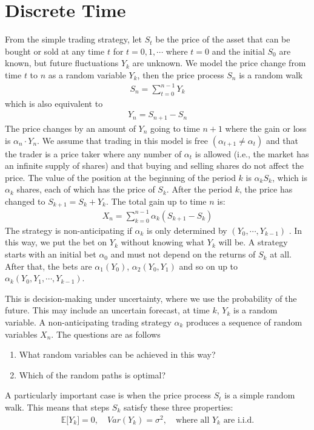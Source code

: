 \section{Discrete Time}
From the simple trading strategy\cite{online:stochastic-calculus}, let $S_t$ be the price of the asset that can be bought or sold at any time $t$ for $t=0,1,\cdots$ where $t=0$ and the initial $S_0$ are known, but future fluctuations $Y_k$ are unknown. We model the price change from time $t$ to $n$ as a random variable $Y_k$, then the price process $S_n$ is a random walk
\begin{align*}
S_{n} = \sum_{t=0}^{n-1} Y_k
\end{align*}
which is also equivalent to
\begin{align*}
Y_{n} = S_{n+1} - S_n
\end{align*}
The price changes by an amount of $Y_n$ going to time $n+1$ where the gain or loss is $\alpha_n \cdot Y_n$. We assume that trading in this model is free $(\alpha_{t+1} \ne \alpha_t)$ and that the trader is a price taker where any number of $\alpha_t$ is allowed (i.e., the market has an infinite supply of shares) and that buying and selling shares do not affect the price. The value of the position at the beginning of the period $k$ is $\alpha_k S_k$, which is $\alpha_k$ shares, each of which has the price of $S_k$. After the period $k$, the price has changed to $S_{k+1} = S_k + Y_k$. The total gain up to time $n$ is:
\begin{align}\label{eq:discrete_ito_integral}
X_n = \sum_{k=0}^{n-1} \alpha_k (S_{k+1} - S_k)
\end{align}
The strategy is non-anticipating if $\alpha_k$ is only determined by $(Y_0, \cdots, Y_{k-1})$ .  In this way, we put the bet on $Y_k$ without knowing what $Y_k$ will be. A strategy starts with an initial bet $\alpha_0$ and must not depend on the returns of $S_k$ at all. After that, the bets are  $\alpha_1(Y_0)$, $\alpha_2(Y_0,Y_1)$ and so on up to $\alpha_k(Y_0,Y_1,\cdots,Y_{k-1})$.

This is decision-making under uncertainty, where we use the probability of the future. This may include an uncertain forecast, at time $k$, $Y_k$ is a random variable. A non-anticipating trading strategy $\alpha_k$ produces a sequence of random variables $X_n$. The questions are as follows
\begin{enumerate}
\item  What random variables can be achieved in this way?
\item Which of the random paths is optimal?
\end{enumerate}
A particularly important case is when the price process $S_t$ is a simple random walk. This means that steps $S_k$ satisfy these three properties:
\begin{align}\label{eq:rand_prop}
\mathbb{E[}Y_k] = 0, \quad Var(Y_k) = \sigma^2, \quad \text{where all $Y_k$ are i.i.d.}
\end{align}

